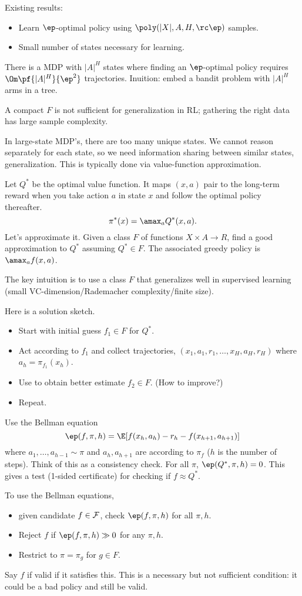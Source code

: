 Existing results:
\begin{itemize}
\item
Learn $\ep$-optimal policy using $\poly(|X|, A, H, \rc\ep)$ samples. 
\item
Small number of states necessary for learning.
\end{itemize}
There is a MDP with $|A|^H$ states where finding an $\ep$-optimal policy requires $\Om\pf{|A|^H}{\ep^2}$ trajectories. Inuition: embed a bandit problem with $|A|^H$ arms in a tree.

A compact $F$ is not sufficient for generalization in RL; gathering the right data has large sample complexity.

In large-state MDP's, there are too many unique states. We cannot reason separately for each state, so we need information sharing between similar states, generalization. This is typically done via value-function approximation.

Let $Q^*$ be the optimal value function. It maps $(x,a)$ pair to the long-term reward when you take action $a$ in state $x$ and follow the optimal policy thereafter. 
$$
\pi^*(x) = \amax_a Q^*(x,a).
$$
Let's approximate it. Given a class $F$ of functions $X\times A\to R$, find a good approximation to $Q^*$ assuming $Q^*\in F$. The associated greedy policy is $\amax_af(x,a)$. 

The key intuition is to use a class $F$ that generalizes well in supervised learning (small VC-dimension/Rademacher complexity/finite size).

Here is a solution sketch.
\begin{itemize}
\item
Start with initial guess $f_1\in F$ for $Q^*$.
\item
Act according to $f_1$ and collect trajectories, $(x_1,a_1,r_1,\ldots, x_H,a_H,r_H)$ where $a_h=\pi_{f_1}(x_h)$. 
\item
Use to obtain better estimate $f_2\in F$. (How to improve?)
\item
Repeat.
\end{itemize}
Use the Bellman equation
$$
\ep(f,\pi,h) = \E[f(x_h,a_h) - r_h - f(x_{h+1},a_{h+1})]
$$
where $a_1,\ldots, a_{h-1}\sim \pi$ and $a_h,a_{h+1}$ are according to $\pi_f$ ($h$ is the number of steps). Think of this as a consistency check. %
For all $\pi$, $\ep (Q^*,\pi,h)=0$. This gives a test (1-sided certificate) for checking if $f\approx Q^*$.

To use the Bellman equations, 
\begin{itemize}
\item
given candidate $f\in \cal F$, check $\ep(f,\pi,h)$ for all $\pi,h$.
\item
Reject $f$ if $\ep(f,\pi,h)\gg 0$ for any $\pi,h$.
\item
Restrict to $\pi=\pi_g$ for $g\in F$. %
\end{itemize}
Say $f$ if valid if it satisfies this. This is a necessary but not sufficient condition: it could be a bad policy and still be valid.

